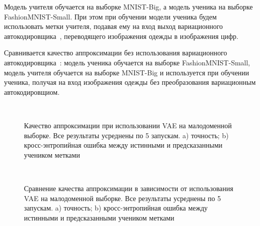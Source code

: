 Модель учителя обучается на выборке MNIST-Big, а модель ученика на выборке FashionMNIST-Small. При этом при обучении модели ученика будем использовать метки учителя, подавая ему на вход выход вариационного автокодировщика~\cite{VAE}, переводящего изображения одежды в изображения цифр.

Сравнивается качество аппроксимации без использования вариационного автокодировщика~\cite{VAE}: модель ученика обучается на выборке FashionMNIST-Small, модель учителя обучается на выборке MNIST-Big и используется при обучении ученика, получая на вход изображения одежды без преобразования вариационным автокодировщиом.\\

\begin{figure}[h!t]\center
{}
\\
\caption{Качество аппроксимации при использовании VAE на малодоменной выборке. Все результаты усреднены по 5 запускам. a) точность; b) кросс-энтропийная ошибка между истинными и предсказанными учеником метками}
\end{figure}

\begin{figure}[h!t]\center
{}
\\
\caption{Сравнение качества аппроксимации в зависимости от использования VAE на малодоменной выборке. Все результаты усреднены по 5 запускам. a) точность; b) кросс-энтропийная ошибка между истинными и предсказанными учеником метками}
\end{figure}

